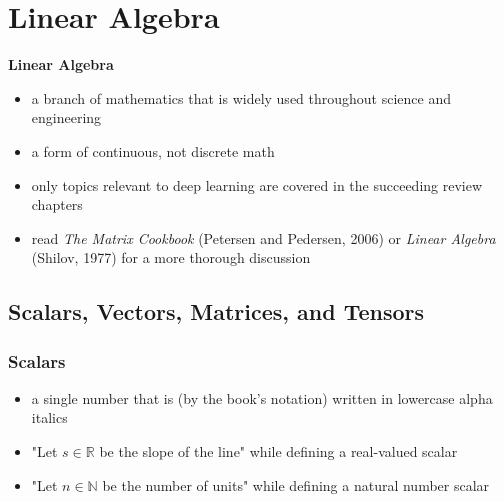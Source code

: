 \documentclass[11pt,twocolumn]{report}
\def\realnumbers{\mathbb{R}}
\def\naturalnumbers{\mathbb{N}}
\begin{document}
\chapter{Linear Algebra}

\textbf{Linear Algebra}
\begin{itemize}
  \item a branch of mathematics that is widely used throughout science and
    engineering
  \item a form of continuous, not discrete math
  \item only topics relevant to deep learning are covered in the succeeding
    review chapters
  \item read \textit{The Matrix Cookbook} (Petersen and Pedersen, 2006) or
    \textit{Linear Algebra} (Shilov, 1977) for a more thorough discussion
\end{itemize}

\section{Scalars, Vectors, Matrices, and Tensors}

\subsection{Scalars}
\begin{itemize}
  \item a single number that is (by the book's notation) written in lowercase
    alpha italics
  \item "Let $ s \in \realnumbers $ be the slope of the line" while defining a
    real-valued scalar
  \item "Let $ n \in \naturalnumbers $ be the number of units" while defining a
    natural number scalar
\end{itemize}
\end{document}
